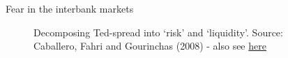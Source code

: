 \begin{frame}{Fear in the interbank markets}

\begin{figure}
\begin{center}


\caption{\label{fig:L4_ted_spread_and_liquidity} Decomposing Ted-spread into `risk' and `liquidity'. Source: Caballero, Fahri and Gourinchas (2008) - also see \href{https://www.investopedia.com/articles/active-trading/061114/what-ois-libor-spread-and-what-it.asp}{here}}

\end{center}
\end{figure}


\end{frame}

